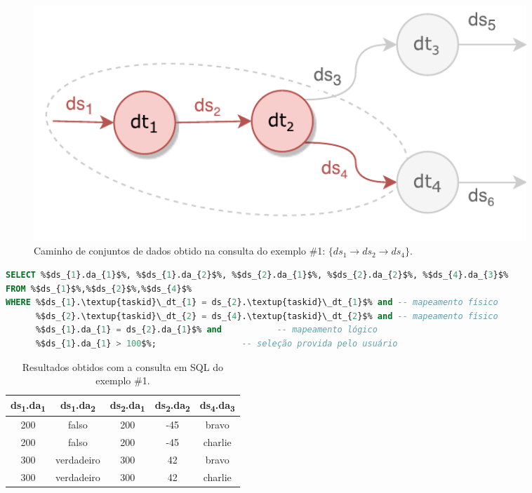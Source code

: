 \begin{figure}[!htb]
    \centering
    \includegraphics[width=0.9\textwidth]{img/example-query-dataflow-1}
    \caption[Caminho obtido na consulta do exemplo \#1]{Caminho de conjuntos de dados obtido na consulta do exemplo \#1: \(\{ds_{1} \rightarrow ds_{2} \rightarrow ds_{4}\}.\)}%
    \label{fig:example-query-dataflow-1}
\end{figure}

\begin{minipage}[c]{0.95\textwidth}
\begin{lstlisting}[language=sql,label={lst:example-query-output-1},caption={[Código SQL gerado no exemplo~\#1]Código SQL gerado pela função \texttt{generateSqlQuery} no exemplo~\#1.}]
SELECT %$ds_{1}.da_{1}$%, %$ds_{1}.da_{2}$%, %$ds_{2}.da_{1}$%, %$ds_{2}.da_{2}$%, %$ds_{4}.da_{3}$%
FROM %$ds_{1}$%,%$ds_{2}$%,%$ds_{4}$%
WHERE %$ds_{1}.\textup{taskid}\_dt_{1} = ds_{2}.\textup{taskid}\_dt_{1}$% and -- mapeamento físico
      %$ds_{2}.\textup{taskid}\_dt_{2} = ds_{4}.\textup{taskid}\_dt_{2}$% and -- mapeamento físico
      %$ds_{1}.da_{1} = ds_{2}.da_{1}$% and           -- mapeamento lógico
      %$ds_{1}.da_{1} > 100$%;                 -- seleção provida pelo usuário
\end{lstlisting}
\end{minipage}

\begin{table}[!htb]
    \centering
    \begin{tabular}{c|c|c|c|c}
\textbf{ds\textsubscript{1}.da\textsubscript{1}} & \textbf{ds\textsubscript{1}.da\textsubscript{2}} & \textbf{ds\textsubscript{2}.da\textsubscript{1}} & \textbf{ds\textsubscript{2}.da\textsubscript{2}} & \textbf{ds\textsubscript{4}.da\textsubscript{3}} \\ \hline
200              & falso            & 200              & -45              & bravo            \\
200              & falso            & 200              & -45              & charlie          \\
300              & verdadeiro       & 300              & 42               & bravo            \\
300              & verdadeiro       & 300              & 42               & charlie         
    \end{tabular}
    \caption[Resultados obtidos com a consulta em SQL do exemplo \#1]{Resultados obtidos com a consulta em SQL do exemplo \#1.}
    \label{tab:example-query-results-1}
\end{table}